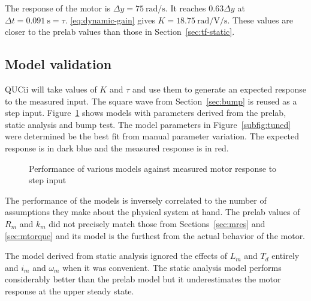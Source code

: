 The response of the motor is $\Delta y = \SI{75}{\radian\per\second}$.
It reaches $0.63 \Delta y$ at $\Delta t = \SI{0.091}{\second} = \tau$. \eqref{eq:dynamic-gain} gives $K = \SI{18.75}{\radian\per\volt\per\second}$.
These values are closer to the prelab values than those in Section~\ref{sec:tf-static}.

\subsection{Model validation}\label{sec:validation}
QUCii will take values of $K$ and $\tau$ and use them to generate an expected response to the measured input.
The square wave from Section~\ref{sec:bump} is reused as a step input.
Figure~\ref{fig:validation} shows models with parameters derived from the prelab, static analysis and bump test.
The model parameters in Figure~\ref{subfig:tuned} were determined be the best fit from manual parameter variation.
The expected response is in dark blue and the measured response is in red.
\begin{figure}[t!]
  \caption{Performance of various models against measured motor response to step input}
  \label{fig:validation}
\end{figure}

The performance of the models is inversely correlated to the number of assumptions they make about the physical system at hand.
The prelab values of $R_m$ and $k_m$ did not precisely match those from Sections~\ref{sec:mres} and \ref{sec:mtorque} and its model is the furthest from the actual behavior of the motor.

The model derived from static analysis ignored the effects of $L_m$ and $T_d$ entirely and $i_m$ and $\omega_m$ when it was convenient.
The static analysis model performs considerably better than the prelab model but it underestimates the motor response at the upper steady state.

